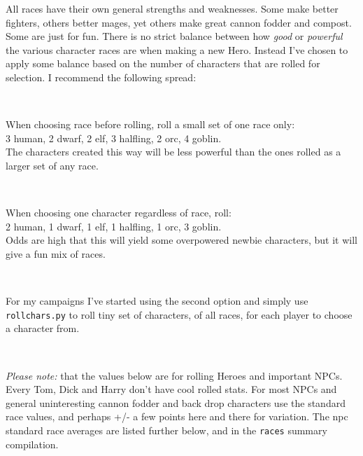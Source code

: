 \noindent All races have their own general strengths and weaknesses. Some make better fighters, others better mages, yet others make great cannon fodder and compost. Some are just for fun.
There is no strict balance between how \emph{good} or \emph{powerful} the various character races are when making a new Hero. Instead I've chosen to apply some balance based on the number of characters that are rolled for selection. I recommend the following spread:

\

\noindent When choosing race before rolling, roll a small set of one race only:\\
3 human, 2 dwarf, 2 elf, 3 halfling, 2 orc, 4 goblin.\\
The characters created this way will be less powerful than the ones rolled as a larger set of any race.

\

\noindent When choosing one character regardless of race, roll:\\
2 human, 1 dwarf, 1 elf, 1 halfling, 1 orc, 3 goblin.\\
Odds are high that this will yield some overpowered newbie characters, but it will give a fun mix of races.

\

\noindent For my campaigns I've started using the second option and simply use \verb|rollchars.py| to roll tiny set of characters, of all races, for each player to choose a character from.

\

\noindent \emph{Please note:} that the values below are for rolling Heroes and important NPCs. Every Tom, Dick and Harry don't have cool rolled stats. For most NPCs and general uninteresting cannon fodder and back drop characters use the standard race values, and perhaps +/- a few points here and there for variation. The npc standard race averages are listed further below, and in the \verb|races| summary compilation.








